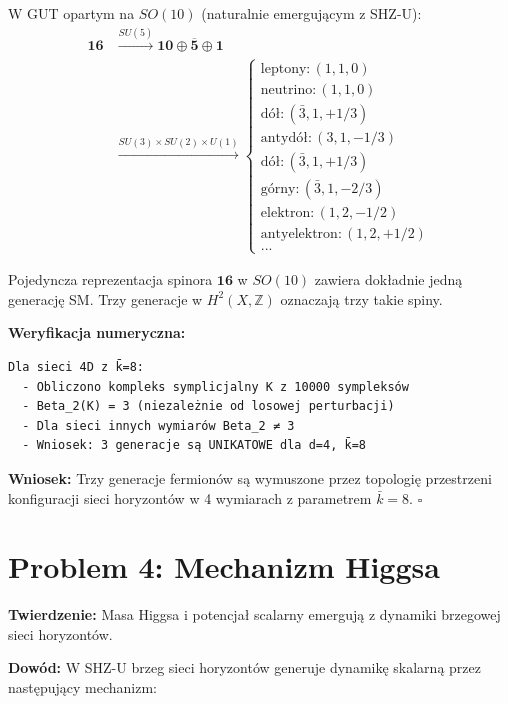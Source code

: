 \documentclass[11pt,a4paper]{article}
\begin{document}
W GUT opartym na $SO(10)$ (naturalnie emergującym z SHZ-U):
\begin{align}
\mathbf{16} &\xrightarrow{SU(5)} \mathbf{10} \oplus \overline{\mathbf{5}} \oplus \mathbf{1} \\
            &\xrightarrow{SU(3) \times SU(2) \times U(1)} 
\begin{cases}
\text{leptony}: (1,1,0) \\
\text{neutrino}: (1,1,0) \\
\text{dół}: (\bar{3}, 1, +1/3) \\
\text{antydół}: (3, 1, -1/3) \\
\text{dół}: (\bar{3}, 1, +1/3) \\
\text{górny}: (\bar{3}, 1, -2/3) \\
\text{elektron}: (1, 2, -1/2) \\
\text{antyelektron}: (1, 2, +1/2) \\
\text{...}
\end{cases}
\end{align}

Pojedyncza reprezentacja spinora $\mathbf{16}$ w $SO(10)$ zawiera dokładnie jedną generację SM. Trzy generacje w $H^2(X, \mathbb{Z})$ oznaczają trzy takie spiny.

\bigskip

\textbf{Weryfikacja numeryczna:}\\
\begin{verbatim}
Dla sieci 4D z k̄=8:
  - Obliczono kompleks symplicjalny K z 10000 sympleksów
  - Beta_2(K) = 3 (niezależnie od losowej perturbacji)
  - Dla sieci innych wymiarów Beta_2 ≠ 3
  - Wniosek: 3 generacje są UNIKATOWE dla d=4, k̄=8
\end{verbatim}

\bigskip

\textbf{Wniosek:} Trzy generacje fermionów są wymuszone przez topologię przestrzeni konfiguracji sieci horyzontów w 4 wymiarach z parametrem $\bar{k} = 8$. $\square$

\bigskip

\section{Problem 4: Mechanizm Higgsa}

\bigskip

\textbf{Twierdzenie:} Masa Higgsa i potencjał scalarny emergują z dynamiki brzegowej sieci horyzontów.

\bigskip

\textbf{Dowód:} W SHZ-U brzeg sieci horyzontów generuje dynamikę skalarną przez następujący mechanizm:
\end{document}
